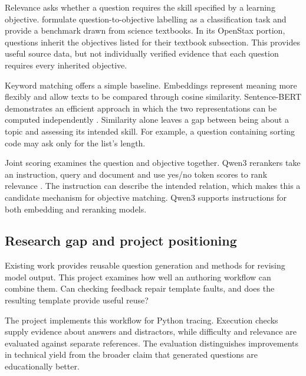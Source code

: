 Relevance asks whether a question requires the skill specified by a learning objective. \textcite{zur2023} formulate question-to-objective labelling as a classification task and provide a benchmark drawn from science textbooks. In its OpenStax portion, questions inherit the objectives listed for their textbook subsection. This provides useful source data, but not individually verified evidence that each question requires every inherited objective.

Keyword matching offers a simple baseline. Embeddings represent meaning more flexibly and allow texts to be compared through cosine similarity. Sentence-BERT demonstrates an efficient approach in which the two representations can be computed independently \parencite{reimers2019}. Similarity alone leaves a gap between being about a topic and assessing its intended skill. For example, a question containing sorting code may ask only for the list's length.

Joint scoring examines the question and objective together. Qwen3 rerankers take an instruction, query and document and use yes/no token scores to rank relevance \parencite{zhang2025}. The instruction can describe the intended relation, which makes this a candidate mechanism for objective matching. Qwen3 supports instructions for both embedding and reranking models.

\subsection{Research gap and project positioning}\label{sec:literature-2-6}

Existing work provides reusable question generation and methods for revising model output. This project examines how well an authoring workflow can combine them. Can checking feedback repair template faults, and does the resulting template provide useful reuse?

The project implements this workflow for Python tracing. Execution checks supply evidence about answers and distractors, while difficulty and relevance are evaluated against separate references. The evaluation distinguishes improvements in technical yield from the broader claim that generated questions are educationally better.
